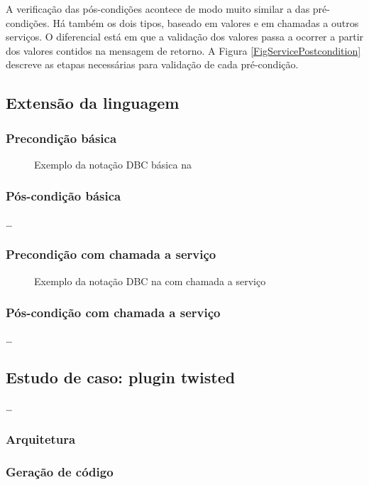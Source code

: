 A verificação das pós-condições acontece de modo muito similar a das
pré-condições. Há também os dois tipos, baseado em valores e em chamadas a
outros serviços. O diferencial está em que a validação dos valores passa a
ocorrer a partir dos valores contidos na mensagem de retorno. A Figura
\ref{FigServicePostcondition} descreve as etapas necessárias para validação de
cada pré-condição.

	
	
	
	

\subsection{Extensão da linguagem}

\subsubsection{Precondição básica}

\begin{figure}[htb]
\begin{small}

\end{small}
\caption{Exemplo da notação DBC básica na \neoidl{}}
\label{lst:DBCService}
\end{figure} 

\subsubsection{Pós-condição básica}

\ldots



\subsubsection{Precondição com chamada a serviço}

\begin{figure}[htb]
\begin{small}

\end{small}
\caption{Exemplo da notação DBC na \neoidl{} com chamada a serviço}
\label{lst:DBCService}
\end{figure} 


\subsubsection{Pós-condição com chamada a serviço}

\ldots

\subsection{Estudo de caso: plugin twisted}

\ldots

\subsubsection{Arquitetura}



\subsubsection{Geração de código}